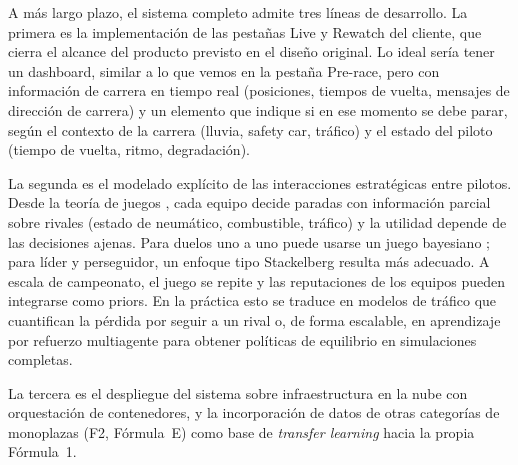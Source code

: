 A más largo plazo, el sistema completo admite tres líneas de desarrollo. La primera es la implementación de las pestañas Live y Rewatch del cliente, que cierra el alcance del producto previsto en el diseño original. Lo ideal sería tener un dashboard, similar a lo que vemos en la pestaña Pre-race, pero con información de carrera en tiempo real (posiciones, tiempos de vuelta, mensajes de dirección de carrera) y un elemento que indique si en ese momento se debe parar, según el contexto de la carrera (lluvia, safety car, tráfico) y el estado del piloto (tiempo de vuelta, ritmo, degradación). 

La segunda es el modelado explícito de las interacciones estratégicas entre pilotos. Desde la teoría de juegos \cite{wikipediagametheory}, cada equipo decide paradas con información parcial sobre rivales (estado de neumático, combustible, tráfico) y la utilidad depende de las decisiones ajenas. Para duelos uno a uno puede usarse un juego bayesiano \cite{wikipediabayesiangame}; para líder y perseguidor, un enfoque tipo Stackelberg \cite{fieni2025gametheory} resulta más adecuado. A escala de campeonato, el juego se repite y las reputaciones de los equipos pueden integrarse como priors. En la práctica esto se traduce en modelos de tráfico que cuantifican la pérdida por seguir a un rival o, de forma escalable, en aprendizaje por refuerzo multiagente \cite{wikipediamarl} para obtener políticas de equilibrio en simulaciones completas.

La tercera es el despliegue del sistema sobre infraestructura en la nube con orquestación de contenedores, y la incorporación de datos de otras categorías de monoplazas (F2, Fórmula~E) como base de \textit{transfer learning} hacia la propia Fórmula~1.
